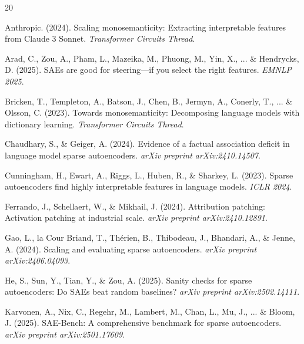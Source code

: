 \documentclass{article}
\begin{document}

\begin{thebibliography}{20}

Anthropic. (2024).
\newblock Scaling monosemanticity: Extracting interpretable features from Claude 3 Sonnet.
\newblock \emph{Transformer Circuits Thread}.

Arad, C., Zou, A., Pham, L., Mazeika, M., Phuong, M., Yin, X., ... \& Hendrycks, D. (2025).
\newblock SAEs are good for steering---if you select the right features.
\newblock \emph{EMNLP 2025}.

Bricken, T., Templeton, A., Batson, J., Chen, B., Jermyn, A., Conerly, T., ... \& Olsson, C. (2023).
\newblock Towards monosemanticity: Decomposing language models with dictionary learning.
\newblock \emph{Transformer Circuits Thread}.

Chaudhary, S., \& Geiger, A. (2024).
\newblock Evidence of a factual association deficit in language model sparse autoencoders.
\newblock \emph{arXiv preprint arXiv:2410.14507}.

Cunningham, H., Ewart, A., Riggs, L., Huben, R., \& Sharkey, L. (2023).
\newblock Sparse autoencoders find highly interpretable features in language models.
\newblock \emph{ICLR 2024}.

Ferrando, J., Schellaert, W., \& Mikhail, J. (2024).
\newblock Attribution patching: Activation patching at industrial scale.
\newblock \emph{arXiv preprint arXiv:2410.12891}.

Gao, L., la Cour Briand, T., Th{\'e}rien, B., Thibodeau, J., Bhandari, A., \& Jenne, A. (2024).
\newblock Scaling and evaluating sparse autoencoders.
\newblock \emph{arXiv preprint arXiv:2406.04093}.

He, S., Sun, Y., Tian, Y., \& Zou, A. (2025).
\newblock Sanity checks for sparse autoencoders: Do SAEs beat random baselines?
\newblock \emph{arXiv preprint arXiv:2502.14111}.

Karvonen, A., Nix, C., Regehr, M., Lambert, M., Chan, L., Mu, J., ... \& Bloom, J. (2025).
\newblock SAE-Bench: A comprehensive benchmark for sparse autoencoders.
\newblock \emph{arXiv preprint arXiv:2501.17609}.


\end{thebibliography}
\end{document}
